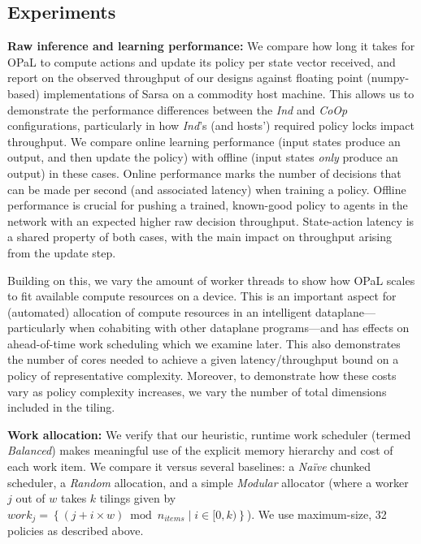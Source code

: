 \documentclass[
sigconf,natbib=false
]{acmart}
\newcommand{\fakepara}[1]{\noindent\textbf{#1:}}
\newcommand{\approachshort}{OPaL}
\newcommand{\Coopfw}{\emph{CoOp}}
\newcommand{\coopfw}{\Coopfw}
\newcommand{\Indfw}{\emph{Ind}}
\newcommand{\indfw}{\Indfw}
\begin{document}
\subsection{Experiments}

\fakepara{Raw inference and learning performance}
We compare how long it takes for \approachshort{} to compute actions and update its policy per state vector received, and report on the observed throughput of our designs against floating point (numpy-based) implementations of Sarsa on a commodity host machine.
This allows us to demonstrate the performance differences between the \indfw{} and \coopfw{} configurations, particularly in how \indfw's (and hosts') required policy locks impact throughput.
We compare online learning performance (input states produce an output, and then update the policy) with offline (input states \emph{only} produce an output) in these cases.
Online performance marks the number of decisions that can be made per second (and associated latency) when training a policy.
Offline performance is crucial for pushing a trained, known-good policy to agents in the network with an expected higher raw decision throughput.
State-action latency is a shared property of both cases, with the main impact on throughput arising from the update step.

Building on this, we vary the amount of worker threads to show how \approachshort{} scales to fit available compute resources on a device.
This is an important aspect for (automated) allocation of compute resources in an intelligent dataplane---particularly when cohabiting with other dataplane programs---and has effects on ahead-of-time work scheduling which we examine later.
This also demonstrates the number of cores needed to achieve a given latency/throughput bound on a policy of representative complexity.
Moreover, to demonstrate how these costs vary as policy complexity increases, we vary the number of total dimensions included in the tiling.

\fakepara{Work allocation}
We verify that our heuristic, runtime work scheduler (termed \emph{Balanced}) makes meaningful use of the explicit memory hierarchy and cost of each work item.
We compare it versus several baselines: a \emph{Na\"{i}ve} chunked scheduler, a \emph{Random} allocation, and a simple \emph{Modular} allocator (where a worker $j$ out of $w$ takes $k$ tilings given by $\mathit{work}_j=\left\{\left(j + i \times w\right) \bmod n_{\mathit{items}} \mid i \in [0,k) \right\}$).
We use maximum-size, \SI{32}{\bit} policies as described above.
\end{document}
